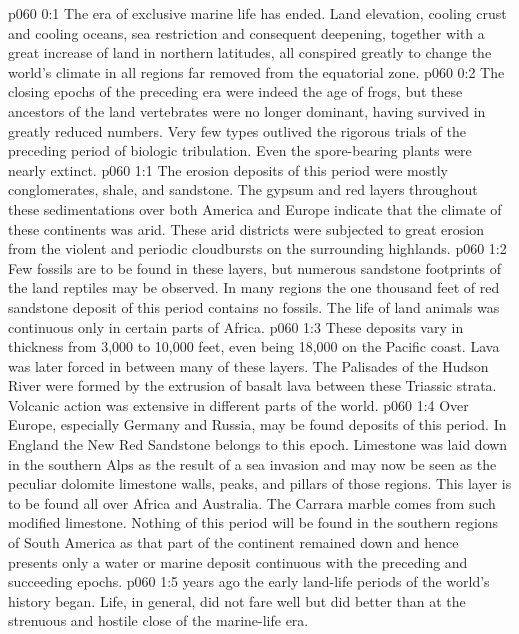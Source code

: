 \author{Life Carrier}
\vs p060 0:1 The era of exclusive marine life has ended. Land elevation, cooling crust and cooling oceans, sea restriction and consequent deepening, together with a great increase of land in northern latitudes, all conspired greatly to change the world’s climate in all regions far removed from the equatorial zone.
\vs p060 0:2 The closing epochs of the preceding era were indeed the age of frogs, but these ancestors of the land vertebrates were no longer dominant, having survived in greatly reduced numbers. Very few types outlived the rigorous trials of the preceding period of biologic tribulation. Even the spore\hyp{}bearing plants were nearly extinct.\plusone
{}
\vs p060 1:1 The erosion deposits of this period were mostly conglomerates, shale, and sandstone. The gypsum and red layers throughout these sedimentations over both America and Europe indicate that the climate of these continents was arid. These arid districts were subjected to great erosion from the violent and periodic cloudbursts on the surrounding highlands.
\vs p060 1:2 Few fossils are to be found in these layers, but numerous sandstone footprints of the land reptiles may be observed. In many regions the one thousand feet of red sandstone deposit of this period contains no fossils. The life of land animals was continuous only in certain parts of Africa.
\vs p060 1:3 These deposits vary in thickness from 3,000 to 10,000 feet, even being 18,000 on the Pacific coast. Lava was later forced in between many of these layers. The Palisades of the Hudson River were formed by the extrusion of basalt lava between these Triassic strata. Volcanic action was extensive in different parts of the world.
\vs p060 1:4 Over Europe, especially Germany and Russia, may be found deposits of this period. In England the New Red Sandstone belongs to this epoch. Limestone was laid down in the southern Alps as the result of a sea invasion and may now be seen as the peculiar dolomite limestone walls, peaks, and pillars of those regions. This layer is to be found all over Africa and Australia. The Carrara marble comes from such modified limestone. Nothing of this period will be found in the southern regions of South America as that part of the continent remained down and hence presents only a water or marine deposit continuous with the preceding and succeeding epochs.
\pc \vs p060 1:5  years ago the early land\hyp{}life periods of the world’s history began. Life, in general, did not fare well but did better than at the strenuous and hostile close of the marine\hyp{}life era.
